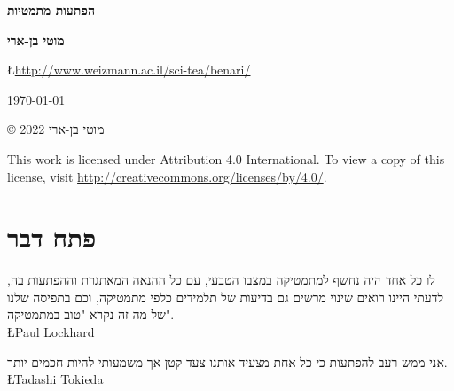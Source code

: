 
\pagestyle{empty}

\begin{center}
\textbf{\Huge הפתעות מתמטיות}
 
\bigskip
\bigskip
\bigskip
\bigskip

\textbf{\Large מוטי בן-ארי}

\bigskip
\bigskip


\L{\url{http://www.weizmann.ac.il/sci-tea/benari/}}

\bigskip
\bigskip

\today{}
\end{center}


\vfill

\begin{center}
\copyright{} מוטי בן-ארי
2022
 \end{center}

\begin{english}
\begin{small}
This work is licensed under Attribution 4.0 International. To view a copy of this license, visit \url{http://creativecommons.org/licenses/by/4.0/}.

\end{small}
\end{english}



\thispagestyle{empty}
\pagestyle{plain}

\chapter*{פתח דבר}
\thispagestyle{empty}

\begin{flushleft}
\parbox{7cm}{
\begin{small}
\begin{flushleft}
לו כל אחד היה נחשף למתמטיקה במצבו הטבעי, עם כל ההנאה המאתגרת וההפתעות בה, לדעתי היינו רואים שינוי מרשים גם בדיעות של תלמידים כלפי מתמטיקה, וכם בתפיסה שלנו של מה זה נקרא "טוב במתמטיקה".\\
\L{Paul Lockhard}

\bigskip

אני ממש רעב להפתעות כי כל אחת מצעיד אותנו צעד קטן אך משמעותי להיות חכמים יותר.\\
\L{Tadashi Tokieda}
\end{flushleft}
\end{small}
}
\end{flushleft}

